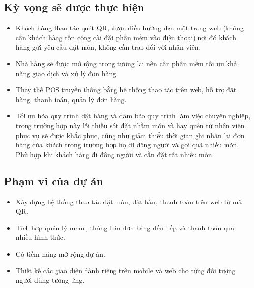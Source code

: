 \documentclass[a4paper]{article}
\begin{document}
\subsection{Kỳ vọng sẽ được thực hiện}
\begin{itemize}
    \item Khách hàng thao tác quét QR, được điều hướng đến một trang web (không cần khách hàng tốn công cài đặt phần mềm vào điện thoại) nơi đó khách hàng gửi yêu cầu đặt món, không cần trao đổi với nhân viên.
    \item Nhà hàng sẽ được mở rộng trong tương lai nên cần phần mềm tối ưu khả năng giao dịch và xử lý đơn hàng.
    \item Thay thế POS truyền thống bằng hệ thống thao tác trên web, hỗ trợ đặt hàng, thanh toán, quản lý đơn hàng.
    \item Tối ưu hóa quy trình đặt hàng và đảm bảo quy trình làm việc chuyên nghiệp, trong trường hợp này lỗi thiếu sót đặt nhầm món và hay quên từ nhân viên phục vụ sẽ được khắc phục, cũng như giảm thiểu thời gian ghi nhận lại đơn hàng của khách trong trường hợp họ đi đông người và gọi quá nhiều món. Phù hợp khi khách hàng đi đông người và cần đặt rất nhiều món.
\end{itemize}

\subsection{Phạm vi của dự án}
\begin{itemize}
    \item Xây dựng hệ thống thao tác đặt món, đặt bàn, thanh toán trên web từ mã QR.
    \item Tích hợp quản lý menu, thông báo đơn hàng đến bếp và thanh toán qua nhiều hình thức.
    \item Có tiềm năng mở rộng dự án.
    \item Thiết kế các giao diện dành riêng trên mobile và web cho từng đối tượng người dùng tương ứng.
\end{itemize}
\end{document}
